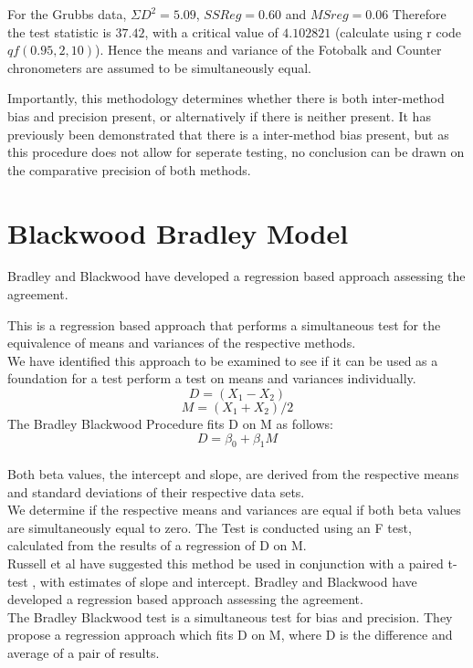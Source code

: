 \documentclass[12pt, a4paper]{report}
\theoremstyle{plain}
\theoremstyle{definition}
\theoremstyle{remark}
\begin{document}
	
	
	
	For the Grubbs data, $\Sigma D^{2}=5.09 $, $SSReg = 0.60$ and
	$MSreg=0.06$ Therefore the test statistic is $37.42$, with a
	critical value of $4.102821$ (calculate using r code
	$qf(0.95,2,10)$). Hence the means and variance of the Fotobalk and
	Counter chronometers are assumed to be simultaneously equal.
	
	Importantly, this methodology determines whether there is both
	inter-method bias and precision present, or alternatively if there
	is neither present. It has previously been demonstrated that there
	is a inter-method bias present, but as this procedure does not
	allow for seperate testing, no conclusion can be drawn on the
	comparative precision of both methods.

	\section{Blackwood Bradley Model} 
	
		Bradley and Blackwood have developed a regression based approach
		assessing the agreement.
		
		This is a regression based
	approach that performs a simultaneous test for the equivalence of
	means and variances of the respective methods.\\We have identified
	this approach  to be examined to see if it can be used as a
	foundation for a test perform a test on
	means and variances individually.\\
	\begin{equation}
	D = (X_{1}-X_{2})
	\end{equation}
	\begin{equation}
	M = (X_{1} + X_{2}) /2
	\end{equation}
	The Bradley Blackwood Procedure fits D on M as follows:\\
	\begin{equation}
	D = \beta_{0} + \beta_{1}M
	\end{equation}
	\\Both beta values, the intercept and slope, are derived from the respective means and
	standard deviations of their respective data sets.\\
	We determine if the respective means and variances are equal if
	both beta values are simultaneously equal to zero. The Test is
	conducted using an F test, calculated from the results of a
	regression of D on M.
	\\
	Russell et al have suggested this method be used in conjunction
	with a paired t-test , with estimates of slope and intercept.
	Bradley and Blackwood have developed a regression based approach
	assessing the agreement.
	\\
	The Bradley Blackwood test is a simultaneous test for bias and
	precision. They propose a regression approach which fits D on M,
	where D is the difference and average of a pair of results.
	
\end{document}
